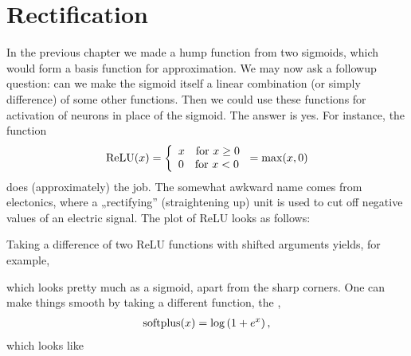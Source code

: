 \documentclass[a4paper,12pt,polish]{jupyterBook}
\begin{document}
\chapter{Rectification}
\label{\detokenize{docs/rectification:rectification}}\label{\detokenize{docs/rectification::doc}}
\sphinxAtStartPar
In the previous chapter we made a hump function from two sigmoids, which would form a basis function for approximation. We may now ask a follow\sphinxhyphen{}up question: can we make the sigmoid itself a linear combination (or simply difference) of some other functions. Then we could use these functions for activation of neurons in place of the sigmoid. The answer is yes. For instance, the  function
\begin{equation*}
\begin{split}
{\rm ReLU}(x) = \left \{ \begin{array}{l} x {\rm ~~~ for~} x \ge 0 \\
                                          0 {\rm ~~~ for~} x < 0 \end{array}    \right . = {\rm max}(x,0)
\end{split}
\end{equation*}
\sphinxAtStartPar
does (approximately) the job. The somewhat awkward name comes from electonics, where a „rectifying” (straightening up) unit is used to cut off negative values of an electric signal. The plot of ReLU looks as follows:
\begin{sphinxVerbatimOutput}

\noindent{}
\end{sphinxVerbatimOutput}

\sphinxAtStartPar
Taking a difference of two ReLU functions with shifted arguments yields, for example,
\begin{sphinxVerbatimOutput}

\noindent{}
\end{sphinxVerbatimOutput}

\sphinxAtStartPar
which looks pretty much as a sigmoid, apart from the sharp corners. One can make things smooth by taking a different function, the ,
\begin{equation*}
\begin{split}
{\rm softplus}(x)=\log \left( 1+e^x \right ),
\end{split}
\end{equation*}
\sphinxAtStartPar
which looks like
\begin{sphinxVerbatimOutput}

\noindent{}
\end{sphinxVerbatimOutput}
\end{document}
